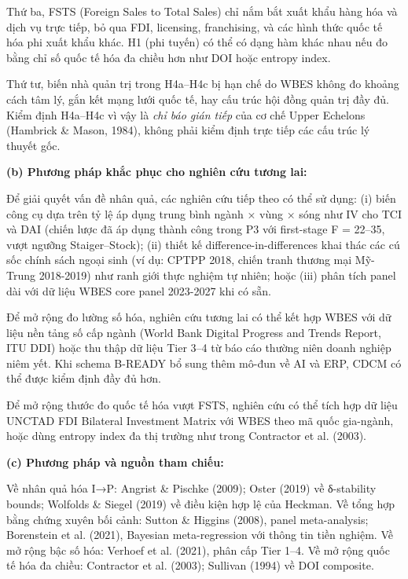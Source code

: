\documentclass[12pt,a4paper]{article}
\begin{document}
Thứ ba, FSTS (Foreign Sales to Total Sales) chỉ nắm bắt xuất khẩu hàng
hóa và dịch vụ trực tiếp, bỏ qua FDI, licensing, franchising, và các
hình thức quốc tế hóa phi xuất khẩu khác. H1 (phi tuyến) có thể có dạng
hàm khác nhau nếu đo bằng chỉ số quốc tế hóa đa chiều hơn như DOI hoặc
entropy index.

Thứ tư, biến nhà quản trị trong H4a--H4c bị hạn chế do WBES không đo
khoảng cách tâm lý, gắn kết mạng lưới quốc tế, hay cấu trúc hội đồng
quản trị đầy đủ. Kiểm định H4a--H4c vì vậy là \emph{chỉ báo gián tiếp}
của cơ chế Upper Echelons (Hambrick \& Mason, 1984), không phải kiểm
định trực tiếp các cấu trúc lý thuyết gốc.

\textbf{(b) Phương pháp khắc phục cho nghiên cứu tương lai:}

Để giải quyết vấn đề nhân quả, các nghiên cứu tiếp theo có thể sử dụng:
(i) biến công cụ dựa trên tỷ lệ áp dụng trung bình ngành × vùng × sóng
như IV cho TCI và DAI (chiến lược đã áp dụng thành công trong P3 với
first-stage F = 22--35, vượt ngưỡng Staiger--Stock); (ii) thiết kế
difference-in-differences khai thác các cú sốc chính sách ngoại sinh (ví
dụ: CPTPP 2018, chiến tranh thương mại Mỹ-Trung 2018-2019) như ranh giới
thực nghiệm tự nhiên; hoặc (iii) phân tích panel dài với dữ liệu WBES
core panel 2023-2027 khi có sẵn.

Để mở rộng đo lường số hóa, nghiên cứu tương lai có thể kết hợp WBES với
dữ liệu nền tảng số cấp ngành (World Bank Digital Progress and Trends
Report, ITU DDI) hoặc thu thập dữ liệu Tier 3--4 từ báo cáo thường niên
doanh nghiệp niêm yết. Khi schema B-READY bổ sung thêm mô-đun về AI và
ERP, CDCM có thể được kiểm định đầy đủ hơn.

Để mở rộng thước đo quốc tế hóa vượt FSTS, nghiên cứu có thể tích hợp dữ
liệu UNCTAD FDI Bilateral Investment Matrix với WBES theo mã quốc
gia-ngành, hoặc dùng entropy index đa thị trường như trong Contractor et
al. (2003).

\textbf{(c) Phương pháp và nguồn tham chiếu:}

Về nhân quả hóa I→P: Angrist \& Pischke (2009); Oster (2019) về
δ-stability bounds; Wolfolds \& Siegel (2019) về điều kiện hợp lệ của
Heckman. Về tổng hợp bằng chứng xuyên bối cảnh: Sutton \& Higgins
(2008), panel meta-analysis; Borenstein et al. (2021), Bayesian
meta-regression với thông tin tiền nghiệm. Về mở rộng bậc số hóa:
Verhoef et al. (2021), phân cấp Tier 1--4. Về mở rộng quốc tế hóa đa
chiều: Contractor et al. (2003); Sullivan (1994) về DOI composite.
\end{document}
